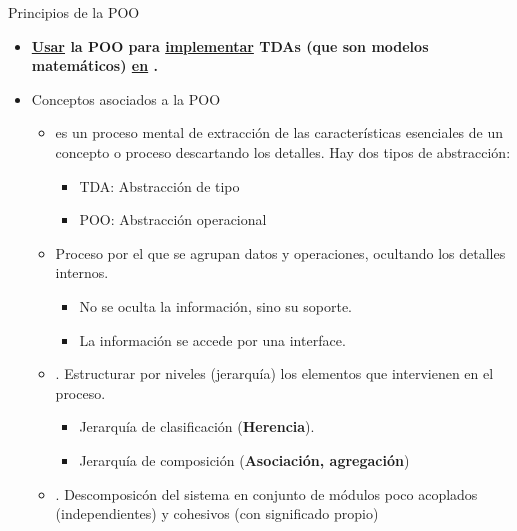\documentclass[10pt,envcountsect,spanish]{beamer}
\begin{document}
\begin{frame}{Principios de la POO}

\begin{itemize}
\item \small {} 

\centerline{\bf \underline{Usar} la POO para \underline{implementar} TDAs (que son modelos matemáticos) \underline{en} .}

\item Conceptos asociados a la POO

\begin{itemize} 
\item {} es un proceso mental de extracción de las características esenciales de un concepto o proceso descartando los detalles. Hay dos tipos de abstracción:

\begin{itemize}
\item TDA: Abstracción de tipo
\item POO: Abstracción operacional
\end{itemize}


\item {} Proceso por el que se agrupan datos y operaciones, ocultando los detalles internos.

\begin{itemize}
\item No se oculta la información, sino su soporte. 
\item La información se accede por una interface.
\end{itemize}


\item {}. Estructurar por niveles (jerarquía) los elementos que intervienen en el proceso.

\begin{itemize}
\item Jerarquía de clasificación (\textbf{Herencia}).

\item Jerarquía de composición (\textbf{Asociación, agregación})
\end{itemize}



\item {}. Descomposicón del sistema en conjunto de módulos poco acoplados (independientes) y cohesivos (con significado propio)
\end{itemize}

\end{itemize}


\end{frame}
\end{document}
